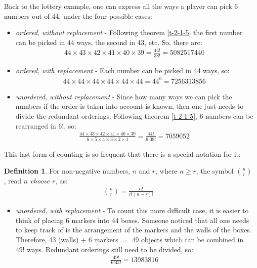 \documentclass[
  oneside,
  11pt, a4paper,
  footinclude=true,
  headinclude=true,
  cleardoublepage=empty
]{scrbook}
\theoremstyle{definition}
\newtheorem{definition}{Definition}[section]
\theoremstyle{definition}
\begin{document}
        Back to the lottery example, one can express all the ways a player can pick 6 numbers out of 44, under the four possible cases:
        
        \begin{itemize}
            \item \emph{ordered, without replacement} - Following theorem \ref{t-2-1-5} the first number can be picked in 44 ways, the second in 43, etc. So, there are:
            \begin{align*}
                44 \times 43 \times 42 \times 41 \times 40 \times 39 = \frac{44!}{38!} = 5082517440
            \end{align*}{}
            \item \emph{ordered, with replacement} - Each number can be picked in 44 ways, so:
            \begin{align*}
                44 \times 44 \times 44 \times 44 \times 44 \times 44 = 44^6 = 7256313856
            \end{align*}{}
            \item \emph{unordered, without replacement} - Since how many ways we can pick the numbers if the order is taken into account is known, then one just needs to divide the redundant orderings. Following theorem \ref{t-2-1-5}, 6 numbers can be rearranged in $6!$, so:
            \begin{align*}
                \frac{44 \times 43 \times 42 \times 41 \times 40 \times 39}{6 \times 5 \times 4 \times 3 \times 2 \times 1} = \frac{44!}{6!38!} = 7059052
            \end{align*}{}
        \end{itemize}{}
        
        This last form of counting is so frequent that there is a special notation for it:
        
        \begin{definition}{For non-negative numbers, $n$ and $r$, where $n \geq r$, the symbol $\binom{n}{r}$, read \emph{$n$ choose $r$}, as:}
            \begin{align*}
                \binom{n}{r} = \frac{n!}{r!(n-r)!}
            \end{align*}{}
        \end{definition}{}
       \begin{itemize}
            \item \emph{unordered, with replacement} - %
            To count this more difficult case, it is easier to think of placing 6 markers into 44 boxes. Someone noticed \citep{feller-vol-2} that all one needs to keep track of is the arrangement of the markers and the walls of the boxes. Therefore, 43 (walls) $+$ 6 markers $=$ 49 objects which can be combined in $49!$ ways. Redundant orderings still need to be divided, so: 
            \begin{align*}
                \frac{49!}{6!43!} = 13983816
            \end{align*}{}
        \end{itemize}{}
        
\end{document}
